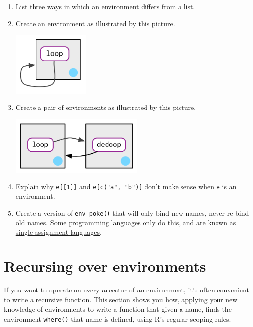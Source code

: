 \documentclass[]{book}
\theoremstyle{definition}
\theoremstyle{definition}
\theoremstyle{definition}
\theoremstyle{remark}
\begin{document}
\begin{enumerate}
\def\labelenumi{\arabic{enumi}.}
\item
  List three ways in which an environment differs from a list.
\item
  Create an environment as illustrated by this picture.

  \begin{center}\includegraphics[width=1.48in]{diagrams/environments/recursive-1} \end{center}
\item
  Create a pair of environments as illustrated by this picture.

  \begin{center}\includegraphics[width=2.56in]{diagrams/environments/recursive-2} \end{center}
\item
  Explain why \texttt{e{[}{[}1{]}{]}} and \texttt{e{[}c("a",\ "b"){]}}
  don't make sense when \texttt{e} is an environment.
\item
  Create a version of \texttt{env\_poke()} that will only bind new
  names, never re-bind old names. Some programming languages only do
  this, and are known as
  \href{http://en.wikipedia.org/wiki/Assignment_(computer_science)\#Single_assignment}{single
  assignment languages}.
\end{enumerate}

\hypertarget{env-recursion}{%
\section{Recursing over environments}\label{env-recursion}}

If you want to operate on every ancestor of an environment, it's often
convenient to write a recursive function. This section shows you how,
applying your new knowledge of environments to write a function that
given a name, finds the environment \texttt{where()} that name is
defined, using R's regular scoping rules.
\end{document}
